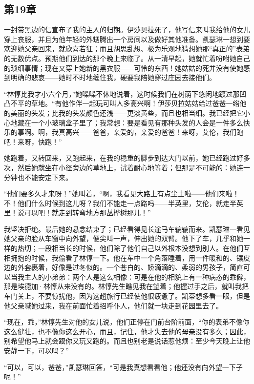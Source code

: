 \subsection{第19章}

\par 一封带黑边的信宣布了我的主人的归期。伊莎贝拉死了，他写信来叫我给他的女儿穿上丧服，并且为他年轻的外甥腾出一个房间以及做好其他准备。凯瑟琳一想到要欢迎她父亲回来，就欣喜若狂；而且胡思乱想、极为乐观地猜想她那“真正的”表弟的无数优点。预期他们到达的那个晚上来临了。从一清早起，她就忙着吩咐她自己的琐细事情；现在又穿上她新的黑衣服——可怜的东西！她姑姑的死并没有使她感到明确的悲哀——她时不时地缠住我，硬要我陪她穿过庄园去接他们。
\par “林惇比我才小六个月，”她喋喋不休地说着，这时候我们在树荫下悠闲地踱过那凹凸不平的草地。“有他作伴一起玩可叫人多高兴啊！伊莎贝拉姑姑给过爸爸一绺他的美丽的头发；比我的头发颜色还浅——更淡黄些，而且也相当细。我已经把它小心地藏在一个小玻璃盒子里了；我常想：要是看见有那种头发的人会是一件多么快乐的事啊。啊，我真高兴——爸爸，亲爱的，亲爱的爸爸！来呀，艾伦，我们跑吧！来呀，快跑！”
\par 她跑着，又转回来，又跑起来，在我的稳重的脚步到达大门以前，她已经跑过好多次，然后她就坐在小径旁边的草地上，试着耐心地等着；但那是不可能的：她连一分钟也不能安定下来。
\par “他们要多久才来呀！”她叫着，“啊，我看见大路上有点尘土啦——他们来啦！不！他们什么时候到这儿呀？我们不能走一点路吗——半英里，艾伦，就走半英里！说可以吧！就走到转弯地方那丛桦树那儿！”
\par 我坚决拒绝。最后她的悬念结束了；已经看得见长途马车辘辘而来。凯瑟琳一看见她父亲的脸从车窗中向外望，便尖叫一声，伸出她的双臂。他下了车，几乎和她一样的热切；一段相当长的时候，他们除了他们自己以外根本没想到别人。在他们互相拥抱的时候，我偷看了林惇一下。他在车中一个角落睡着，用一件暖和的、镶皮边的外套裹着，好像是过冬似的。一个苍白的、娇滴滴的、柔弱的男孩子，简直可以当我主人的小弟弟：两个人是这么相像：可是在他的相貌上有一种病态的乖僻，那是埃德加·林惇从来没有的。林惇先生瞧见我在望着；他握过手之后，就叫我把车门关上，不要惊扰他，因为这趟旅行已经使他很疲惫了。凯蒂想多看一眼，但是他父亲喊她过来，我在前面忙着招呼仆人，他们就一块走到花园里去了。
\par “现在，乖，”林惇先生对他的女儿说，他们正停在门前台阶前面，“你的表弟不像你这么健壮，也不像你这么开心，而且，记住，他才失去他的母亲没有多久；因此，别希望他马上就会跟你又玩又跑的。而且也别老是说话惹他烦：至少今天晚上让他安静一下，可以吗？”
\par “可以，可以，爸爸，”凯瑟琳回答，“可是我真想看看他；他还没有向外望一下子呢！”
